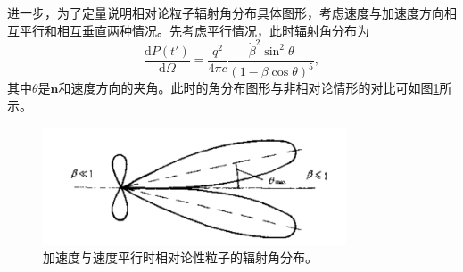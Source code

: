 \documentclass[../天体物理基础.tex]{subfiles}
\begin{document}
进一步，为了定量说明相对论粒子辐射角分布具体图形，考虑速度与加速度方向相互平行和相互垂直两种情况。先考虑平行情况，此时辐射角分布为
\begin{equation}
\frac{\mathrm{d}P\left(t'\right)}{\mathrm{d}\Omega}=\frac{q^{2}}{4\pi c}\frac{\dot{\beta}^{2}\sin^{2}\theta}{\left(1-\beta\cos\theta\right)^{5}},
\end{equation}
其中$\theta$是$\boldsymbol{n}$和速度方向的夹角。此时的角分布图形与非相对论情形的对比可如图\ref{加速度与速度平行时相对论性粒子的辐射角分布。}所示。
\begin{figure}[!htbp]
\centering
\includegraphics[width=9cm]{figures/figure1_6.png}
\captionsetup{justification=raggedright, singlelinecheck=false}
\caption{加速度与速度平行时相对论性粒子的辐射角分布。}
\label{加速度与速度平行时相对论性粒子的辐射角分布。}
\end{figure}
\end{document}
